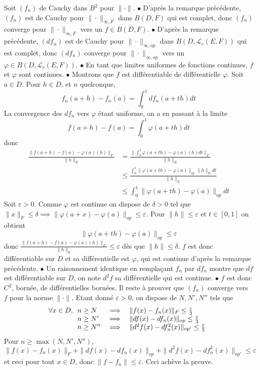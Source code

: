 \documentclass{report}
\begin{document}
\newline
Soit $(f_n)$ de Cauchy dans $B^2$ pour $\|\cdot \|$.\newline
$\bullet$ D'après la remarque précédente, $(f_n)$ est de Cauchy pour $\|\cdot\|_{\infty, F}$ dans $B(D,F)$ qui est complet, donc $(f_n)$ converge pour $\|\cdot\|_{\infty, F}$ vers un $f\in B(D,F)$.\newline
$\bullet$ D'après la remarque précédente, $(df_n)$ est de Cauchy pour $\|\cdot\|_{\infty, op}$ dans $B(D,\mathcal L_c(E,F))$ qui est complet, donc $(df_n)$ converge pour $\|\cdot\|_{\infty, op}$ vers un $\varphi\in B(D,\mathcal L_c(E,F))$.\newline
$\bullet$ En tant que limites uniformes de fonctions continues, $f$ et $\varphi$ sont continues.\newline
$\bullet$ Montrons que $f$ est différentiable de différentielle $\varphi$.\newline
Soit $a\in D$. Pour $h\in D$, et $n$ quelconque, $$f_n(a+h)-f_n(a)=\int_0^1 df_n(a+th)dt$$
La convergence des $df_n$ vers $\varphi$ étant uniforme, on a en passant à la limite $$f(a+h)-f(a) = \int_0^1 \varphi(a+th) dt$$
donc $$\begin{aligned} \frac{\|f(a+h)-f(a)-\varphi(a)(h)\|_F}{\|h\|_E}&=\frac{\|\int_0^1 \varphi(a+th)-  \varphi(a)(h) dt\|_F}{\|h\|_E} \\
&\leq \frac{\int_0^1 \|\varphi(a+th)-\varphi(a)\|_{op}\|h\|_E dt}{\|h\|_E}\\
&\leq \int_0^1 \|\varphi(a+th)-\varphi(a)\|_{op} dt \end{aligned}$$
Soit $\varepsilon>0$. Comme $\varphi$ est continue on dispose de $\delta >0$ tel que $\|x\|_F \leq \delta \implies \|\varphi(a+x)-\varphi(a)\|_{op} \leq \varepsilon$. Pour $\|h\| \leq \varepsilon$ et $t\in [0,1]$ on obtient $$\|\varphi(a+th)-\varphi(a)\|_{op}\leq \varepsilon$$ donc $\displaystyle \frac{\|f(a+h)-f(a)-\varphi(a)(h)\|_F}{\|h\|_E}\leq \varepsilon$ dès que $\|h\| \leq \delta$.\newline
$f$ est donc différentiable sur $D$ et sa différentielle est $\varphi$, qui est continue d'après la remarque précédente.\newline
$\bullet$ Un raisonnement identique en remplaçant $f_n$ par $df_n$ montre que $df$ est différentiable sur $D$, on note $d^2f$ sa différentielle qui est continue.\newline
$\bullet$ $f$ est donc $C^2$, bornée, de différentielles bornées. Il reste à prouver que $(f_n)$ converge vers $f$ pour la norme $\|\cdot\|$.\newline
Etant donné $\varepsilon >0$, on dispose de $N,N',N''$ tels que $$ 
\forall x\in D, \begin{array}[t]{lcl} n\geq N &\implies &\|f(x) -f_n(x)\|_F \leq \frac{\varepsilon}3 \\
n\geq N' &\implies &\|df(x) -df_n(x)\|_{op} \leq \frac{\varepsilon}3 \\
n\geq N'' &\implies &\|d^2f(x) -df^2_n(x)\|_{op'} \leq \frac{\varepsilon}3
\end{array}$$
Pour $n\geq \max(N,N',N'')$, $$\|f(x) -f_n(x)\|_F+\|df(x) -df_n(x)\|_{op}+\|d^2f(x) -df^2_n(x)\|_{op'}\leq \varepsilon$$ et ceci pour tout $x\in D$, donc $\|f-f_n\|\leq \varepsilon$. Ceci achève la preuve.
\end{document}
